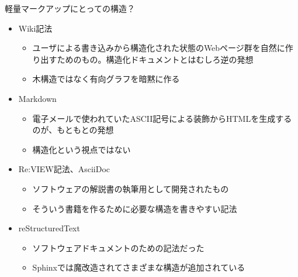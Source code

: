 \documentclass[14pt,dvipdfmx,uplatex]{beamer}
\begin{document}
\begin{frame}[t]{\inhibitglue 軽量マークアップにとっての構造？}
  \sffamily
  \begin{itemize}
    \item Wiki記法
    \begin{itemize}
        \item ユーザによる書き込みから構造化された状態のWebページ群を自然に作り出すためのもの。構造化ドキュメントとはむしろ逆の発想
        \item 木構造ではなく有向グラフを暗黙に作る
    \end{itemize}
    \item Markdown
    \begin{itemize}
        \item 電子メールで使われていたASCII記号による装飾からHTMLを生成するのが、もともとの発想
        \item 構造化という視点ではない
    \end{itemize}
    \item Re:VIEW記法、AsciiDoc
    \begin{itemize}
        \item ソフトウェアの解説書の執筆用として開発されたもの
        \item そういう書籍を作るために必要な構造を書きやすい記法
    \end{itemize}
    \item reStructuredText
    \begin{itemize}
        \item ソフトウェアドキュメントのための記法だった
        \item Sphinxでは魔改造されてさまざまな構造が追加されている
    \end{itemize}
  \end{itemize}
\end{frame}
\end{document}
